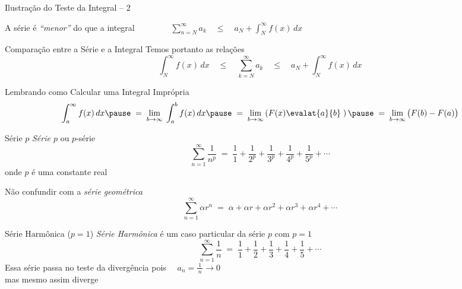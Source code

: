 \begin{frame}{Ilustração do Teste da Integral -- 2}
  \begin{center}
    \scalebox{.9}{}
  \end{center}

  \pause
  A série é \emph{``menor''} do que a integral
  \pause
  \(
    \qquad\qquad
    \sum_{n=N}^\infty a_k
    \quad\leq\quad
    a_{N} + \int_{N}^\infty f(x)\,dx
  \)
\end{frame}

\begin{frame}{Comparação entre a Série e a Integral}
  Temos portanto as relações
  \[
  \int_{N}^{\infty} f(x)\,dx
  \quad\leq\quad
  \sum_{k=N}^{\infty} a_k
  \quad\leq\quad
  a_N + \int_{N}^{\infty} f(x)\,dx
  \]
\end{frame}

\begin{frame}{Lembrando como Calcular uma Integral Imprópria}
  \[
    \int_{a}^{\infty} f(x)\,dx
    \pause \;=\;
    \lim_{b\to\infty} \; \int_{a}^{b} f(x)\,dx
    \pause \;=\;
    \lim_{b\to\infty} \left( F(x) \evalat{a}{b} \; \right)
    \pause \;=\;
    \lim_{b\to\infty} \big( F(b) - F(a) \big)
  \]
\end{frame}

\begin{frame}{Série $p$}
  \emph{Série $p$} ou $p$-série
  \[ \sum_{n=1}^{\infty} \frac{1}{n^p} \;=\;
     \frac{1}{1} +
     \frac{1}{2^p} +
     \frac{1}{3^p} +
     \frac{1}{4^p} +
     \frac{1}{5^p} + \cdots
  \]
  onde $p$ é uma constante real

  \pause
  \vspace{\baselineskip}
  Não confundir com a \emph{série geométrica}
  \[
    \sum_{n=1}^{\infty} \alpha r^n
    \;=\; \alpha + \alpha r + \alpha r^2 + \alpha r^3 + \alpha r^4 + \cdots
  \]

\end{frame}

\begin{frame}{Série Harmônica ($p=1$)}
  \emph{Série Harmônica} é um caso particular da série $p$ com $p=1$
  \[ \sum_{n=1}^{\infty} \frac{1}{n} \;=\;
     \frac{1}{1} +
     \frac{1}{2} +
     \frac{1}{3} +
     \frac{1}{4} +
     \frac{1}{5} + \cdots
  \]
  \pause
  Essa série passa no teste da divergência pois \(\quad a_n = \frac{1}{\,n\,}\to 0\) \\[3mm]
  mas mesmo assim diverge
\end{frame}

